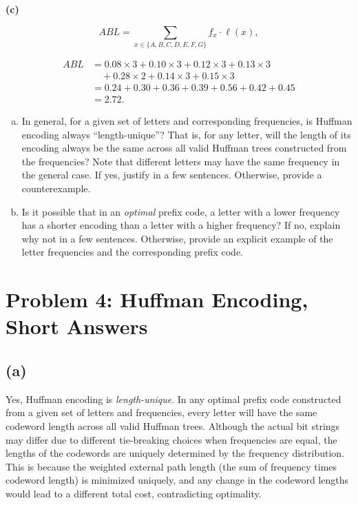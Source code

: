 \documentclass[11pt]{article}
\begin{document}
    \bigskip
    \textbf{(c) }

    \[
    ABL = \sum_{x \in \{A,B,C,D,E,F,G\}} f_x \cdot \ell(x),
    \]

    \[
    \begin{aligned}
    ABL &= 0.08 \times 3 + 0.10 \times 3 + 0.12 \times 3 + 0.13 \times 3 \\
        &\quad + 0.28 \times 2 + 0.14 \times 3 + 0.15 \times 3 \\
        &= 0.24 + 0.30 + 0.36 + 0.39 + 0.56 + 0.42 + 0.45 \\
        &= 2.72.
    \end{aligned}
    \]
    \newpage

    \begin{tcolorbox}[title={Problem 4 (Huffman Encoding, Short Answers, 15 points)}] \setlength\parindent{1em}
        \begin{enumerate}[(a)]
        \item In general, for a given set of letters and corresponding frequencies, is Huffman encoding always ``length-unique''? That is, for any letter, will the length of its encoding always be the same across all valid Huffman trees constructed from the frequencies? Note that different letters may have the same frequency in the general case. If yes, justify in a few sentences. Otherwise, provide a counterexample.
        \item Is it possible that in an \emph{optimal} prefix code, a letter with a lower frequency has a shorter encoding than a
        letter with a higher frequency? If no, explain why not in a few sentences. Otherwise, provide an explicit example of the letter frequencies and the corresponding prefix code.
        \end{enumerate}    
    \end{tcolorbox}
    
    \section*{Problem 4: Huffman Encoding, Short Answers}

    \subsection*{(a)}
    Yes, Huffman encoding is \emph{length-unique}. In any optimal prefix code constructed from a given set of letters and frequencies, every letter will have the same codeword length across all valid Huffman trees. Although the actual bit strings may differ due to different tie-breaking choices when frequencies are equal, the lengths of the codewords are uniquely determined by the frequency distribution. This is because the weighted external path length (the sum of frequency times codeword length) is minimized uniquely, and any change in the codeword lengths would lead to a different total cost, contradicting optimality.
\end{document}
